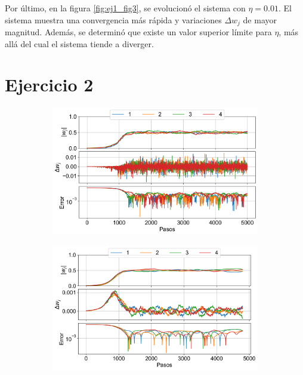 \documentclass[aps,prb,twocolumn,superscriptaddress,floatfix,longbibliography]{revtex4-2}
\newcounter{para}
\begin{document}
Por último, en la figura \ref{fig:ej1_fig3}, se evolucionó el sistema con $\eta = 0.01$. El sistema muestra una convergencia más rápida y variaciones $\Delta w_j$ de mayor magnitud. Además, se determinó que existe un valor superior límite para $\eta$, más allá del cual el sistema tiende a diverger.

\section*{Ejercicio 2}


\onecolumngrid



\begin{figure}
  \centering
  \begin{subfigure}[b]{0.3\textwidth}
      \centering
      \includegraphics[width=\textwidth]{ej1_fig1.png}
      \caption{\label{fig:ej1_fig1}}
  \end{subfigure}
  \hfill
  \begin{subfigure}[b]{0.3\textwidth}
      \centering
      \includegraphics[width=\textwidth]{ej1_fig2.png}

\end{subfigure}
\end{figure}
\end{document}
